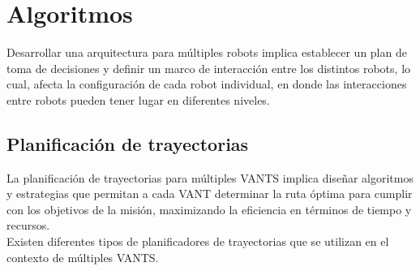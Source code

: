 \documentclass[sigconf]{acmart}
\begin{document}









\section{Algoritmos}

Desarrollar una arquitectura para múltiples robots implica establecer un plan de toma de decisiones y definir un marco de interacción entre los distintos robots, lo cual, afecta la configuración de cada robot individual, en donde las interacciones entre robots pueden tener lugar en diferentes niveles.

\subsection*{Planificación de trayectorias}

La planificación de trayectorias para múltiples VANTS implica diseñar algoritmos y estrategias que permitan a cada VANT determinar la ruta óptima para cumplir con los objetivos de la misión, maximizando la eficiencia en términos de tiempo y recursos.\\
Existen diferentes tipos de planificadores de trayectorias que se utilizan en el contexto de múltiples VANTS.
\end{document}
